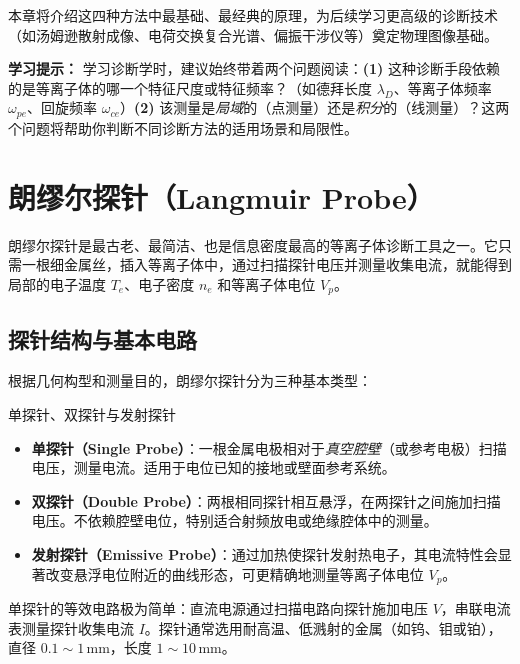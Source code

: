 本章将介绍这四种方法中最基础、最经典的原理，为后续学习更高级的诊断技术（如汤姆逊散射成像、电荷交换复合光谱、偏振干涉仪等）奠定物理图像基础。

\begin{tip}
\textbf{学习提示：}
学习诊断学时，建议始终带着两个问题阅读：\textbf{(1)} 这种诊断手段依赖的是等离子体的哪一个特征尺度或特征频率？（如德拜长度 $\lambda_D$、等离子体频率 $\omega_{pe}$、回旋频率 $\omega_{ce}$）\textbf{(2)} 该测量是\emph{局域}的（点测量）还是\emph{积分}的（线测量）？这两个问题将帮助你判断不同诊断方法的适用场景和局限性。
\end{tip}


\section{朗缪尔探针（Langmuir Probe）}
\label{sec:12.2}

朗缪尔探针是最古老、最简洁、也是信息密度最高的等离子体诊断工具之一。它只需一根细金属丝，插入等离子体中，通过扫描探针电压并测量收集电流，就能得到局部的电子温度 $T_e$、电子密度 $n_e$ 和等离子体电位 $V_p$。

\subsection{探针结构与基本电路}

根据几何构型和测量目的，朗缪尔探针分为三种基本类型：

\begin{definition}{单探针、双探针与发射探针}{}{}
\begin{itemize}
    \item \textbf{单探针（Single Probe）}：一根金属电极相对于\emph{真空腔壁}（或参考电极）扫描电压，测量电流。适用于电位已知的接地或壁面参考系统。
    \item \textbf{双探针（Double Probe）}：两根相同探针相互悬浮，在两探针之间施加扫描电压。不依赖腔壁电位，特别适合射频放电或绝缘腔体中的测量。
    \item \textbf{发射探针（Emissive Probe）}：通过加热使探针发射热电子，其电流特性会显著改变悬浮电位附近的曲线形态，可更精确地测量等离子体电位 $V_p$。
\end{itemize}
\end{definition}

单探针的等效电路极为简单：直流电源通过扫描电路向探针施加电压 $V$，串联电流表测量探针收集电流 $I$。探针通常选用耐高温、低溅射的金属（如钨、钼或铂），直径 $0.1\sim 1\,\mathrm{mm}$，长度 $1\sim 10\,\mathrm{mm}$。

